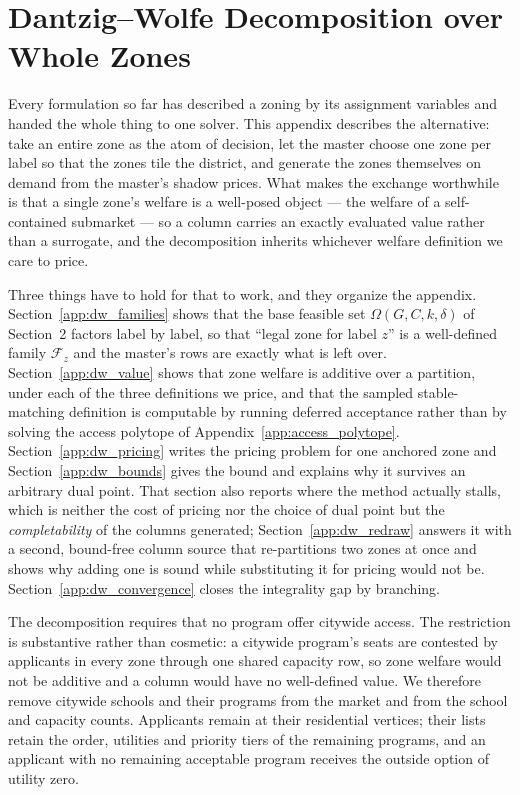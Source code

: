 \documentclass{article}
\begin{document}
\section{Dantzig--Wolfe Decomposition over Whole Zones}
\label{app:dw_mid}
Every formulation so far has described a zoning by its assignment variables and
handed the whole thing to one solver. This appendix describes the alternative:
take an entire zone as the atom of decision, let the master choose one zone per
label so that the zones tile the district, and generate the zones themselves on
demand from the master's shadow prices. What makes the exchange worthwhile is
that a single zone's welfare is a well-posed object --- the welfare of a
self-contained submarket --- so a column carries an exactly evaluated value
rather than a surrogate, and the decomposition inherits whichever welfare
definition we care to price.

Three things have to hold for that to work, and they organize the appendix.
Section~\ref{app:dw_families} shows that the base feasible set
$\Omega(G, C, k, \delta)$ of Section~2 factors label by label, so that ``legal
zone for label $z$'' is a well-defined family $\mathcal F_z$ and the master's
rows are exactly what is left over. Section~\ref{app:dw_value} shows that zone
welfare is additive over a partition, under each of the three definitions we
price, and that the sampled stable-matching definition is computable by running
deferred acceptance rather than by solving the access polytope of
Appendix~\ref{app:access_polytope}. Section~\ref{app:dw_pricing} writes the
pricing problem for one anchored zone and Section~\ref{app:dw_bounds} gives the
bound and explains why it survives an arbitrary dual point. That section also
reports where the method actually stalls, which is neither the cost of pricing
nor the choice of dual point but the \emph{completability} of the columns
generated; Section~\ref{app:dw_redraw} answers it with a second, bound-free
column source that re-partitions two zones at once and shows why adding one is
sound while substituting it for pricing would not be.
Section~\ref{app:dw_convergence} closes the integrality gap by branching.

The decomposition requires that no program offer citywide access. The
restriction is substantive rather than cosmetic: a citywide program's seats are
contested by applicants in every zone through one shared capacity row, so zone
welfare would not be additive and a column would have no well-defined value. We
therefore remove citywide schools and their programs from the market and from
the school and capacity counts. Applicants remain at their residential
vertices; their lists retain the order, utilities and priority tiers of the
remaining programs, and an applicant with no remaining acceptable program
receives the outside option of utility zero.
\end{document}
